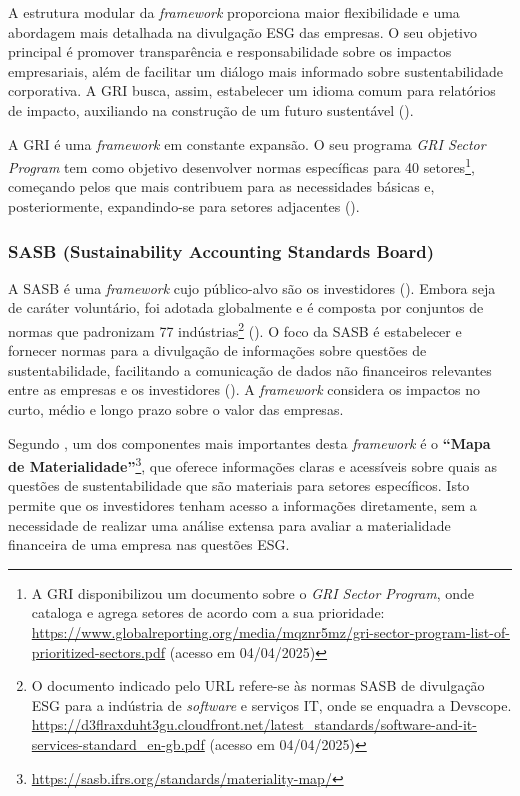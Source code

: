 A estrutura modular da \textit{framework} proporciona maior flexibilidade e uma abordagem mais detalhada na divulgação ESG das empresas. O seu objetivo principal é promover transparência e responsabilidade sobre os impactos empresariais, além de facilitar um diálogo mais informado sobre sustentabilidade corporativa. A GRI busca, assim, estabelecer um idioma comum para relatórios de impacto, auxiliando na construção de um futuro sustentável (\cite{Adams2022}).

A GRI é uma \textit{framework} em constante expansão. O seu programa \textit{GRI Sector Program} tem como objetivo desenvolver normas específicas para 40 setores\footnote{A GRI disponibilizou um documento sobre o \textit{GRI Sector Program}, onde cataloga e agrega setores de acordo com a sua prioridade: \url{https://www.globalreporting.org/media/mqznr5mz/gri-sector-program-list-of-prioritized-sectors.pdf} (acesso em 04/04/2025)}, começando pelos que mais contribuem para as necessidades básicas e, posteriormente, expandindo-se para setores adjacentes (\cite{GRISector2025}).


\subsubsection{SASB (Sustainability Accounting Standards Board)}
\label{subsubsec: SASB}

A \gls{SASB} é uma \textit{framework} cujo público-alvo são os investidores (\cite{GRISASB2021}). Embora seja de caráter voluntário, foi adotada globalmente e é composta por conjuntos de normas que padronizam 77 indústrias\footnote{O documento indicado pelo URL refere-se às normas SASB de divulgação ESG para a indústria de \textit{software} e serviços IT, onde se enquadra a Devscope. \url{https://d3flraxduht3gu.cloudfront.net/latest_standards/software-and-it-services-standard_en-gb.pdf} (acesso em 04/04/2025)} (\cite{SASB2025}). O foco da SASB é estabelecer e fornecer normas para a divulgação de informações sobre questões de sustentabilidade, facilitando a comunicação de dados não financeiros relevantes entre as empresas e os investidores (\cite{Goswami2023}). A \textit{framework} considera os impactos no curto, médio e longo prazo sobre o valor das empresas.

Segundo \cite{Cruz2023}, um dos componentes mais importantes desta \textit{framework} é o \textbf{“Mapa de Materialidade”}\footnote{\url{https://sasb.ifrs.org/standards/materiality-map/}}, que oferece informações claras e acessíveis sobre quais as questões de sustentabilidade que são materiais para setores específicos. Isto permite que os investidores tenham acesso a informações diretamente, sem a necessidade de realizar uma análise extensa para avaliar a materialidade financeira de uma empresa nas questões ESG.

